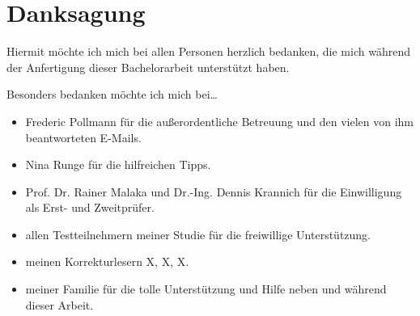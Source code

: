 \documentclass[a4paper,BCOR2mm,12pt,bibliography=totoc,listof=totoc,abstracton]{scrreprt}
\begin{document}
\begin{appendix}

\end{appendix}

\chapter*{Danksagung}
Hiermit möchte ich mich bei allen Personen herzlich bedanken, die mich während der Anfertigung dieser Bachelorarbeit unterstützt haben.

Besonders bedanken möchte ich mich bei\dots
\begin{itemize}
\item Frederic Pollmann für die außerordentliche Betreuung und den vielen von ihm beantworteten E-Mails.
\item Nina Runge für die hilfreichen Tipps.
\item Prof. Dr. Rainer Malaka und Dr.-Ing. Dennis Krannich für die Einwilligung als Erst- und Zweitprüfer.
\item allen Testteilnehmern meiner Studie für die freiwillige Unterstützung.
\item meinen Korrekturlesern X, X, X.
\item meiner Familie für die tolle Unterstützung und Hilfe neben und während dieser Arbeit.
\end{itemize}
\end{document}
